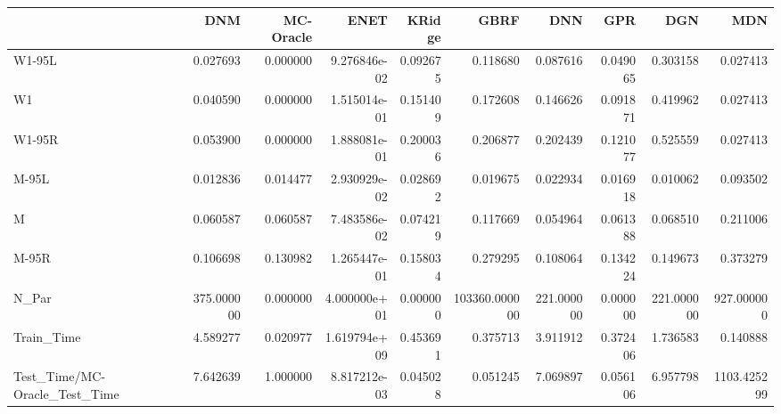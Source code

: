 \begin{tabular}{lrrrrrrrrr}
\toprule
{} &         DNM &  MC-Oracle &          ENET &    KRidge &           GBRF &         DNN &       GPR &         DGN &          MDN \\
\midrule
W1-95L                        &    0.027693 &   0.000000 &  9.276846e-02 &  0.092675 &       0.118680 &    0.087616 &  0.049065 &    0.303158 &     0.027413 \\
W1                            &    0.040590 &   0.000000 &  1.515014e-01 &  0.151409 &       0.172608 &    0.146626 &  0.091871 &    0.419962 &     0.027413 \\
W1-95R                        &    0.053900 &   0.000000 &  1.888081e-01 &  0.200036 &       0.206877 &    0.202439 &  0.121077 &    0.525559 &     0.027413 \\
M-95L                         &    0.012836 &   0.014477 &  2.930929e-02 &  0.028692 &       0.019675 &    0.022934 &  0.016918 &    0.010062 &     0.093502 \\
M                             &    0.060587 &   0.060587 &  7.483586e-02 &  0.074219 &       0.117669 &    0.054964 &  0.061388 &    0.068510 &     0.211006 \\
M-95R                         &    0.106698 &   0.130982 &  1.265447e-01 &  0.158034 &       0.279295 &    0.108064 &  0.134224 &    0.149673 &     0.373279 \\
N\_Par                         &  375.000000 &   0.000000 &  4.000000e+01 &  0.000000 &  103360.000000 &  221.000000 &  0.000000 &  221.000000 &   927.000000 \\
Train\_Time                    &    4.589277 &   0.020977 &  1.619794e+09 &  0.453691 &       0.375713 &    3.911912 &  0.372406 &    1.736583 &     0.140888 \\
Test\_Time/MC-Oracle\_Test\_Time &    7.642639 &   1.000000 &  8.817212e-03 &  0.045028 &       0.051245 &    7.069897 &  0.056106 &    6.957798 &  1103.425299 \\
\bottomrule
\end{tabular}
